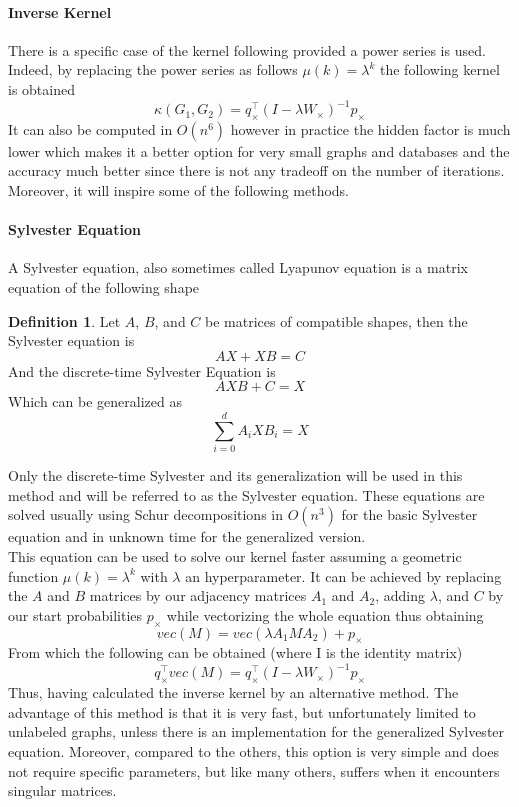 \documentclass{article}
\theoremstyle{definition}
\newtheorem{definition}{Definition}
\begin{document}
\paragraph{Inverse Kernel}
There is a specific case of the kernel following provided a power series is used. Indeed, by replacing the power series as follows $\mu(k)=\lambda^k$ the following kernel is obtained 
\begin{equation}
	\kappa(G_1,G_2)=q_{\times}^{\top}(I-\lambda W_\times)^{-1}p_{\times}
\end{equation}
It can also be computed in $O(n^6)$ however in practice the hidden factor is much lower which makes it a better option for very small graphs and databases and the accuracy much better since there is not any tradeoff on the number of iterations. Moreover, it will inspire some of the following methods.
\paragraph{Sylvester Equation}
A Sylvester equation, also sometimes called Lyapunov equation is a matrix equation of the following shape 
\begin{definition}
	Let $A$, $B$, and $C$ be matrices of compatible shapes, then the Sylvester equation is
	\begin{equation}
	AX+XB=C
	\end{equation}
	And the discrete-time Sylvester Equation is 
	\begin{equation}
	AXB+C=X
	\end{equation}
	Which can be generalized as
	\begin{equation}
		\sum_{i=0}^{d}A_{i}XB_{i}=X
	\end{equation}
\end{definition}
Only the discrete-time Sylvester and its generalization will be used in this method and will be referred to as the Sylvester equation. These equations are solved usually using Schur decompositions in $O(n^3)$ for the basic Sylvester equation and in unknown time for the generalized version\cite{vishwanathan_graph_2010}.\\
This equation can be used to solve our kernel faster assuming a geometric function $\mu(k)=\lambda^k$ with $\lambda$ an hyperparameter. It can be achieved by replacing the $A$ and $B$ matrices by our adjacency matrices $A_1$ and $A_2$, adding $\lambda$, and $C$ by our start probabilities $p_\times$ while vectorizing the whole equation thus obtaining
\begin{equation}
	vec(M) = vec(\lambda A_{1}MA_{2}) + p_{\times}
\end{equation}
From which the following can be obtained (where I is the identity matrix)
\begin{equation}
	q_{\times}^{\top}vec(M)=q_{\times}^{\top}(I-\lambda W_{\times})^{-1}p_{\times}
\end{equation}
Thus, having calculated the inverse kernel by an alternative method. The advantage of this method is that it is very fast, but unfortunately limited to unlabeled graphs, unless there is an implementation for the generalized Sylvester equation. Moreover, compared to the others, this option is very simple and does not require specific parameters, but like many others, suffers when it encounters singular matrices. 
\end{document}
